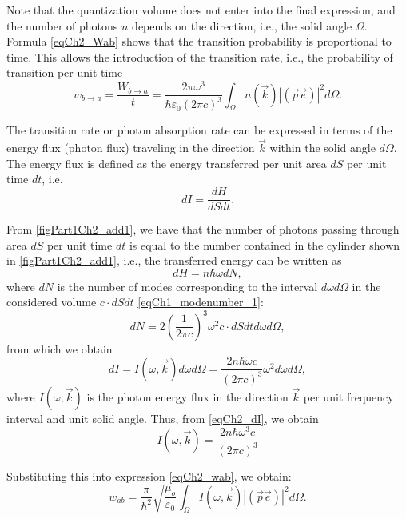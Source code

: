 Note that the quantization volume does not enter into the final expression, and the number of photons $n$ depends on the direction, i.e., the solid angle $\Omega$. Formula \eqref{eqCh2_Wab} shows that the transition probability is proportional to time. This allows the introduction of the transition rate, i.e., the probability of transition per unit time 
\begin{equation}
w_{b \rightarrow a} = \frac{W_{b \rightarrow a}}{t} = \frac{2 \pi
  \omega^3 }  
{\hbar \varepsilon_0 \left(2 \pi c\right)^3}\int_{\Omega} 
n(\vec{k}) \left|\left(\vec{p} \vec{e}\right)\right|^2
d \Omega.
\label{eqCh2_wab} 
\end{equation}

The transition rate or photon absorption rate can be expressed \cite{bLuisell1972} in terms of the energy flux (photon flux) traveling in the direction $\vec{k}$ within the solid angle $d \Omega$.  The energy flux is defined as the energy transferred per unit area $dS$ per unit time $dt$, i.e.
\[
d I = \frac{dH}{dS dt}.
\]

From \autoref{figPart1Ch2_add1}, we have that the number of photons passing through area $dS$ per unit time $dt$ is equal to the number contained in the cylinder shown in \autoref{figPart1Ch2_add1}, i.e., the transferred energy can be written as
\[
dH = n \hbar \omega d N ,
\]
where $dN$ is the number of modes corresponding to the interval $d \omega d \Omega$ in the considered volume $c \cdot dS  dt$ \eqref{eqCh1_modenumber_1}:
\[
d N = 2 \left(\frac{1}{2 \pi c} \right)^3 \omega^2 
c \cdot dS  dt
d \omega d \Omega,
\]
from which we obtain 
\begin{equation}
d I = I\left(\omega, \vec{k}\right) d \omega d \Omega = 
\frac{2 n \hbar \omega c}{\left(2 \pi c\right)^3}
\omega^2 d \omega d \Omega,
\label{eqCh2_dI}
\end{equation}
where $I\left(\omega, \vec{k}\right)$ is the photon energy flux in the direction $\vec{k}$ per unit frequency interval and unit solid angle. Thus, from \eqref{eqCh2_dI}, we obtain 
\begin{equation}
I\left(\omega, \vec{k}\right) = 
\frac{2 n \hbar \omega^3 c}{\left(2 \pi c\right)^3}
\nonumber
\end{equation}

Substituting this into expression \eqref{eqCh2_wab}, we obtain:
\begin{equation}
w_{ab} = \frac{\pi}{\hbar^2}\sqrt{\frac{\mu_o}{\varepsilon_0}}
\int_{\Omega}I\left(\omega, \vec{k}\right)
\left|\left(\vec{p} \vec{e}\right)\right|^2
d \Omega.
\label{eqCh2_WWab}
\end{equation}


